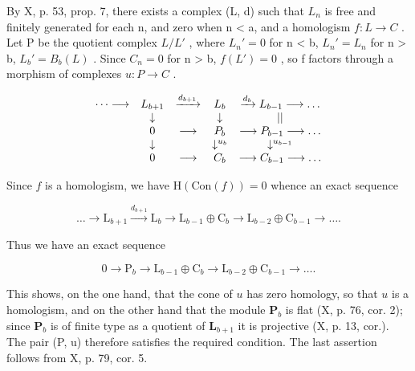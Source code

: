 By X, p. 53, prop. 7, there exists a complex (L, d) such that \(L_{n}\) is free and finitely generated for each n, and zero when n \textless{} a, and a homologism \(f: L \to C\) . Let P be the quotient complex \(L/L'\) , where \(L_{n}' = 0\) for n \textless{} b, \(L_{n}' = L_{n}\) for n \textgreater{} b, \(L_{b}' = B_{b}(L)\) . Since \(C_{n} = 0\) for n \textgreater{} b, \(f(L') = 0\) , so f factors through a morphism of complexes \(u: P \to C\) .

\[
\begin{array}{c c c c c} \dots \longrightarrow & L _ {b + 1} & \xrightarrow {d _ {b + 1}} & L _ {b} & \xrightarrow {d _ {b}} L _ {b - 1} \longrightarrow \dots \\ & \downarrow & & \downarrow & | | \\ & 0 & \longrightarrow & P _ {b} & \longrightarrow P _ {b - 1} \longrightarrow \dots \\ & \downarrow & & \downarrow^ {u _ {b}} & \downarrow^ {u _ {b - 1}} \\ & 0 & \longrightarrow & C _ {b} & \longrightarrow C _ {b - 1} \longrightarrow \dots \end{array}
\]

Since \(f\) is a homologism, we have \(\mathrm{H}(\mathrm{Con}(f)) = 0\) whence an exact sequence

\[
\dots \rightarrow \mathrm{L} _ {b + 1} \xrightarrow {d _ {b + 1}} \mathrm{L} _ {b} \longrightarrow \mathrm{L} _ {b - 1} \oplus \mathrm{C} _ {b} \longrightarrow \mathrm{L} _ {b - 2} \oplus \mathrm{C} _ {b - 1} \rightarrow \dots .
\]

Thus we have an exact sequence

\[
0 \rightarrow \mathrm{P} _ {b} \rightarrow \mathrm{L} _ {b - 1} \oplus \mathrm{C} _ {b} \rightarrow \mathrm{L} _ {b - 2} \oplus \mathrm{C} _ {b - 1} \rightarrow \dots .
\]

This shows, on the one hand, that the cone of \(u\) has zero homology, so that \(u\) is a homologism, and on the other hand that the module \(\mathbf{P}_{b}\) is flat (X, p. 76, cor. 2); since \(\mathbf{P}_{b}\) is of finite type as a quotient of \(\mathbf{L}_{b+1}\) it is projective (X, p. 13, cor.). The pair (P, u) therefore satisfies the required condition. The last assertion follows from X, p. 79, cor. 5.

